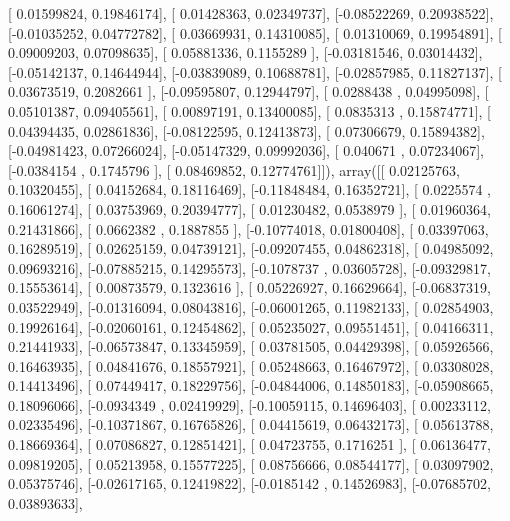 \documentclass{article}
\begin{document}
       [ 0.01599824,  0.19846174],
       [ 0.01428363,  0.02349737],
       [-0.08522269,  0.20938522],
       [-0.01035252,  0.04772782],
       [ 0.03669931,  0.14310085],
       [ 0.01310069,  0.19954891],
       [ 0.09009203,  0.07098635],
       [ 0.05881336,  0.1155289 ],
       [-0.03181546,  0.03014432],
       [-0.05142137,  0.14644944],
       [-0.03839089,  0.10688781],
       [-0.02857985,  0.11827137],
       [ 0.03673519,  0.2082661 ],
       [-0.09595807,  0.12944797],
       [ 0.0288438 ,  0.04995098],
       [ 0.05101387,  0.09405561],
       [ 0.00897191,  0.13400085],
       [ 0.0835313 ,  0.15874771],
       [ 0.04394435,  0.02861836],
       [-0.08122595,  0.12413873],
       [ 0.07306679,  0.15894382],
       [-0.04981423,  0.07266024],
       [-0.05147329,  0.09992036],
       [ 0.040671  ,  0.07234067],
       [-0.0384154 ,  0.1745796 ],
       [ 0.08469852,  0.12774761]]), array([[ 0.02125763,  0.10320455],
       [ 0.04152684,  0.18116469],
       [-0.11848484,  0.16352721],
       [ 0.0225574 ,  0.16061274],
       [ 0.03753969,  0.20394777],
       [ 0.01230482,  0.0538979 ],
       [ 0.01960364,  0.21431866],
       [ 0.0662382 ,  0.1887855 ],
       [-0.10774018,  0.01800408],
       [ 0.03397063,  0.16289519],
       [ 0.02625159,  0.04739121],
       [-0.09207455,  0.04862318],
       [ 0.04985092,  0.09693216],
       [-0.07885215,  0.14295573],
       [-0.1078737 ,  0.03605728],
       [-0.09329817,  0.15553614],
       [ 0.00873579,  0.1323616 ],
       [ 0.05226927,  0.16629664],
       [-0.06837319,  0.03522949],
       [-0.01316094,  0.08043816],
       [-0.06001265,  0.11982133],
       [ 0.02854903,  0.19926164],
       [-0.02060161,  0.12454862],
       [ 0.05235027,  0.09551451],
       [ 0.04166311,  0.21441933],
       [-0.06573847,  0.13345959],
       [ 0.03781505,  0.04429398],
       [ 0.05926566,  0.16463935],
       [ 0.04841676,  0.18557921],
       [ 0.05248663,  0.16467972],
       [ 0.03308028,  0.14413496],
       [ 0.07449417,  0.18229756],
       [-0.04844006,  0.14850183],
       [-0.05908665,  0.18096066],
       [-0.0934349 ,  0.02419929],
       [-0.10059115,  0.14696403],
       [ 0.00233112,  0.02335496],
       [-0.10371867,  0.16765826],
       [ 0.04415619,  0.06432173],
       [ 0.05613788,  0.18669364],
       [ 0.07086827,  0.12851421],
       [ 0.04723755,  0.1716251 ],
       [ 0.06136477,  0.09819205],
       [ 0.05213958,  0.15577225],
       [ 0.08756666,  0.08544177],
       [ 0.03097902,  0.05375746],
       [-0.02617165,  0.12419822],
       [-0.0185142 ,  0.14526983],
       [-0.07685702,  0.03893633],
\end{document}
